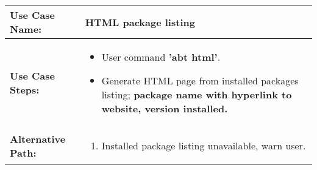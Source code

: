 \medskip

\begin{tabularx}{\linewidth}{|l|X|}
\hline
\textbf{Use Case Name:} & \textbf{HTML package listing} \\
\hline
\textbf{Use Case Steps:} & 
\begin{minipage}{\linewidth} 
  \vspace{0.05em}
  \begin{itemize}
    \item User command \textbf{'abt html'}.
    \item Generate HTML page from installed packages listing; \textbf{package name with hyperlink to website, version installed.}
  \end{itemize}
  \vspace{0.05em}
\end{minipage}
\\
\hline 
\textbf{Alternative Path:} &
\begin{minipage}{\linewidth}
  \vspace{0.05em} 
  \begin{enumerate}
    \item Installed package listing unavailable, warn user.
  \end{enumerate}
  \vspace{0.05em} 
\end{minipage}
\\
\hline
\end{tabularx}

\newpage